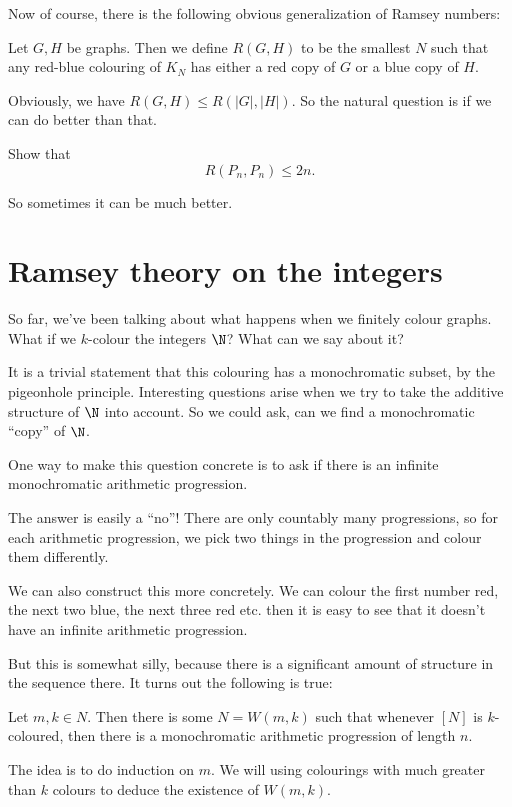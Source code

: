 \documentclass[a4paper]{article}
\begin{document}
Now of course, there is the following obvious generalization of Ramsey numbers:
\begin{defi}[$R(G, H)$]
  Let $G, H$ be graphs. Then we define $R(G, H)$ to be the smallest $N$ such that any red-blue colouring of $K_N$ has either a red copy of $G$ or a blue copy of $H$.
\end{defi}
Obviously, we have $R(G, H) \leq R(|G|, |H|)$. So the natural question is if we can do better than that.

\begin{ex}
  Show that
  \[
    R(P_n, P_n) \leq 2n.
  \]
\end{ex}
So sometimes it can be much better.

\section{Ramsey theory on the integers}
So far, we've been talking about what happens when we finitely colour graphs. What if we $k$-colour the integers $\N$? What can we say about it?

It is a trivial statement that this colouring has a monochromatic subset, by the pigeonhole principle. Interesting questions arise when we try to take the additive structure of $\N$ into account. So we could ask, can we find a monochromatic ``copy'' of $\N$.

One way to make this question concrete is to ask if there is an infinite monochromatic arithmetic progression.

The answer is easily a ``no''! There are only countably many progressions, so for each arithmetic progression, we pick two things in the progression and colour them differently.

We can also construct this more concretely. We can colour the first number red, the next two blue, the next three red etc. then it is easy to see that it doesn't have an infinite arithmetic progression. %

But this is somewhat silly, because there is a significant amount of structure in the sequence there. It turns out the following is true:
\begin{thm}
  Let $m, k \in N$. Then there is some $N = W(m, k)$ such that whenever $[N]$ is $k$-coloured, then there is a monochromatic arithmetic progression of length $n$.
\end{thm}

The idea is to do induction on $m$. We will using colourings with much greater than $k$ colours to deduce the existence of $W(m, k)$.
\end{document}
